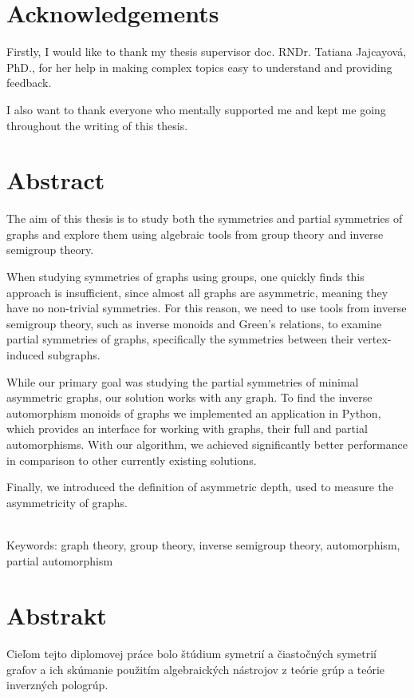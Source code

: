 \documentclass[12pt, a4paper, oneside]{book}
\numberwithin{definition}{chapter}
\numberwithin{theorem}{chapter}
\begin{document}
\chapter*{Acknowledgements}\label{chap:thank_you}
Firstly, I would like to thank my thesis supervisor doc. RNDr. Tatiana Jajcayová, PhD., for her help in making complex topics easy to understand and providing feedback.

I also want to thank everyone who mentally supported me and kept me going throughout the writing of this thesis.
\vfill\eject
\vfill\eject

\chapter*{Abstract}\label{chap:abstract_en}

The aim of this thesis is to study both the symmetries and partial symmetries of graphs and explore them using algebraic tools from group theory and inverse semigroup theory.

When studying symmetries of graphs using groups, one quickly finds this approach is insufficient, since almost all graphs are asymmetric, meaning they have no non-trivial symmetries. For this reason, we need to use tools from inverse semigroup theory, such as inverse monoids and Green's relations, to examine partial symmetries of graphs, specifically the symmetries between their vertex-induced subgraphs.

While our primary goal was studying the partial symmetries of minimal asymmetric graphs, our solution works with any graph. To find the inverse automorphism monoids of graphs we implemented an application in Python, which provides an interface for working with graphs, their full and partial automorphisms. With our algorithm, we achieved significantly better performance in comparison to other currently existing solutions.

Finally, we introduced the definition of asymmetric depth, used to measure the asymmetricity of graphs.

~\\
Keywords: graph theory, group theory, inverse semigroup theory, automorphism, partial automorphism
\vfill\eject
\chapter*{Abstrakt}\label{chap:abstract_sk}

Cieľom tejto diplomovej práce bolo štúdium symetrií a čiastočných symetrií grafov a ich skúmanie použitím algebraických nástrojov z teórie grúp a teórie inverzných pologrúp.
\end{document}
